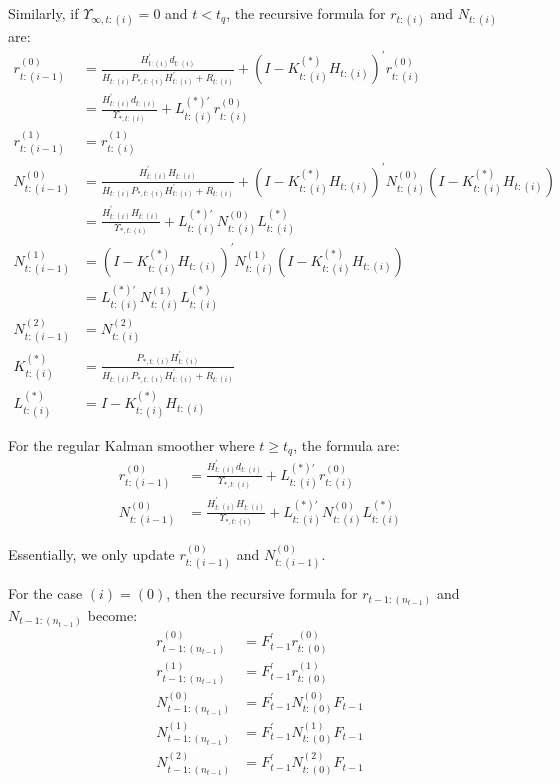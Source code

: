 \documentclass[10pt, titlepage]{article}
\numberwithin{equation}{section}
\begin{document}
Similarly, if $\Upsilon_{\infty,t:(i)}=0$ and $t<t_q$, the recursive formula for $r_{t:(i)}$ and $N_{t:(i)}$ are:
\begin{align}
    r_{t:(i-1)}^{(0)} &= \frac{H_{t:(i)}^{'}d_{t:(i)}}{H_{t:(i)}P_{*,t:(i)}H_{t:(i)}^{'}+R_{t:(i)}} + (I-K_{t:(i)}^{(*)}H_{t:(i)})^{'}r_{t:(i)}^{(0)} \nonumber \\
    &= \frac{H_{t:(i)}^{'}d_{t:(i)}}{\Upsilon_{*,t:(i)}} + L_{t:(i)}^{(*)'}r_{t:(i)}^{(0)} \\
    r_{t:(i-1)}^{(1)} &= r_{t:(i)}^{(1)} \\ 
    N_{t:(i-1)}^{(0)} &= \frac{H_{t:(i)}^{'}H_{t:(i)}}{H_{t:(i)}P_{*,t:(i)}H_{t:(i)}^{'}+R_{t:(i)}}+(I-K_{t:(i)}^{(*)}H_{t:(i)})^{'}N_{t:(i)}^{(0)}(I-K_{t:(i)}^{(*)}H_{t:(i)}) \nonumber \\
    &= \frac{H_{t:(i)}^{'}H_{t:(i)}}{\Upsilon_{*,t:(i)}} + L_{t:(i)}^{(*)'}N_{t:(i)}^{(0)}L_{t:(i)}^{(*)} \\
    N_{t:(i-1)}^{(1)} &= (I-K_{t:(i)}^{(*)}H_{t:(i)})^{'}N_{t:(i)}^{(1)}(I-K_{t:(i)}^{(*)}H_{t:(i)}) \nonumber \\
    &= L_{t:(i)}^{(*)'}N_{t:(i)}^{(1)}L_{t:(i)}^{(*)} \\
    N_{t:(i-1)}^{(2)} &= N_{t:(i)}^{(2)} \\
    K_{t:(i)}^{(*)} &= \frac{P_{*,t:(i)}H_{t:(i)}^{'}}{H_{t:(i)}P_{*,t:(i)}H_{t:(i)}^{'}+R_{t:(i)}} \\
    L_{t:(i)}^{(*)} &= I - K_{t:(i)}^{(*)}H_{t:(i)}
\end{align}

For the regular Kalman smoother where $t\geq t_q$, the formula are: 
\begin{align}
    r_{t:(i-1)}^{(0)} &= \frac{H_{t:(i)}^{'}d_{t:(i)}}{\Upsilon_{*,t:(i)}} + L_{t:(i)}^{(*)'}r_{t:(i)}^{(0)} \\
    N_{t:(i-1)}^{(0)} &= \frac{H_{t:(i)}^{'}H_{t:(i)}}{\Upsilon_{*,t:(i)}} + L_{t:(i)}^{(*)'}N_{t:(i)}^{(0)}L_{t:(i)}^{(*)} 
\end{align}

Essentially, we only update $r_{t:(i-1)}^{(0)}$ and $N_{t:(i-1)}^{(0)}$. 

For the case $(i)=(0)$, then the recursive formula for $r_{t-1:(n_{t-1})}$ and $N_{t-1:(n_{t-1})}$ become:
\begin{align}
    r_{t-1:(n_{t-1})}^{(0)} &= F_{t-1}^{'}r_{t:(0)}^{(0)} \\
    r_{t-1:(n_{t-1})}^{(1)} &= F_{t-1}^{'}r_{t:(0)}^{(1)} \\
    N_{t-1:(n_{t-1})}^{(0)} &= F_{t-1}^{'}N_{t:(0)}^{(0)}F_{t-1} \\
    N_{t-1:(n_{t-1})}^{(1)} &= F_{t-1}^{'}N_{t:(0)}^{(1)}F_{t-1} \\
    N_{t-1:(n_{t-1})}^{(2)} &= F_{t-1}^{'}N_{t:(0)}^{(2)}F_{t-1} \label{eq:diff_uni_end}
\end{align}
\end{document}
